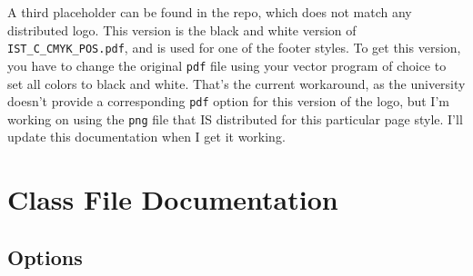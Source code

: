 \documentclass[palatino,english]{ist-report}
\begin{document}
A third placeholder can be found in the repo, which does not match any distributed logo. This version is the black and white version of \texttt{IST\_C\_CMYK\_POS.pdf}, and is used for one of the footer styles. To get this version, you have to change the original \texttt{pdf} file using your vector program of choice to set all colors to black and white. That's the current workaround, as the university doesn't provide a corresponding \texttt{pdf} option for this version of the logo, but I'm working on using the \texttt{png} file that IS distributed for this particular page style. I'll update this documentation when I get it working.

\section{Class File Documentation}

\subsection{Options}\label{sec:options}
\end{document}

